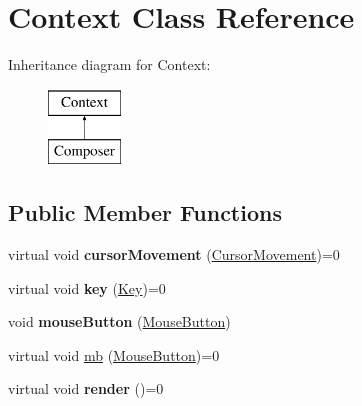 \hypertarget{classContext}{}\section{Context Class Reference}
\label{classContext}
Inheritance diagram for Context\+:\begin{figure}[H]
\begin{center}
\leavevmode
\includegraphics[height=2.000000cm]{classContext}
\end{center}
\end{figure}
\subsection*{Public Member Functions}
\begin{DoxyCompactItemize}
\item 
virtual void {\bfseries cursor\+Movement} (\hyperlink{classCursorMovement}{Cursor\+Movement})=0\hypertarget{classContext_aa940262b2ab80eea625f768f0b6fac7a}{}\label{classContext_aa940262b2ab80eea625f768f0b6fac7a}

\item 
virtual void {\bfseries key} (\hyperlink{classKey}{Key})=0\hypertarget{classContext_a70da8923b6a5a138d8603c609bc31fa6}{}\label{classContext_a70da8923b6a5a138d8603c609bc31fa6}

\item 
void {\bfseries mouse\+Button} (\hyperlink{classMouseButton}{Mouse\+Button})\hypertarget{classContext_a3999d157f67e3ba18cd704a5d4f0178a}{}\label{classContext_a3999d157f67e3ba18cd704a5d4f0178a}

\item 
virtual void \hyperlink{classContext_ab47a1f761c1408d246ef99159b197d3a}{mb} (\hyperlink{classMouseButton}{Mouse\+Button})=0
\item 
virtual void {\bfseries render} ()=0\hypertarget{classContext_a8fb1191127d9d8b5d7c356fc62189d9a}{}\label{classContext_a8fb1191127d9d8b5d7c356fc62189d9a}

\end{DoxyCompactItemize}
